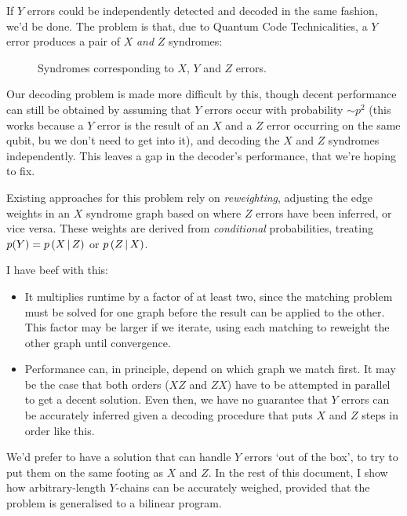 \documentclass[a4paper, english]{scrartcl}
\begin{document}
If $Y$ errors could be independently detected and decoded in the same fashion, we'd be done. 
The problem is that, due to Quantum Code Technicalities\textsuperscript{\textregistered}, a $Y$ error produces a pair of $X$ \emph{and} $Z$ syndromes:
\begin{figure}[!h]
\centering
{}
\caption{Syndromes corresponding to $X$, $Y$ and $Z$ errors.}
\end{figure}

Our decoding problem is made more difficult by this, though decent performance can still be obtained by assuming that $Y$ errors occur with probability $\sim p^2$ (this works because a $Y$ error is the result of an $X$ and a $Z$ error occurring on the same qubit, bu we don't need to get into it), and decoding the $X$ and $Z$ syndromes independently.
This leaves a gap in the decoder's performance, that we're hoping to fix.
 
Existing approaches for this problem \cite{Fowler, DelfosseTillich} rely on \emph{reweighting}, adjusting the edge weights in an $X$ syndrome graph based on where $Z$ errors have been inferred, or vice versa. 
These weights are derived from \emph{conditional} probabilities, treating $p(Y)=p\left(X\, \middle \vert \, Z \right)$ or $p\left(Z\, \middle \vert \, X \right)$.

I have beef with this:
\begin{itemize}
\item It multiplies runtime by a factor of at least two, since the matching problem must be solved for one graph before the result can be applied to the other. 
This factor may be larger if we iterate, using each matching to reweight the other graph until convergence.
\item Performance can, in principle, depend on which graph we match first. It may be the case that both orders ($XZ$ and $ZX$) have to be attempted in parallel to get a decent solution. 
Even then, we have no guarantee that $Y$ errors can be accurately inferred given a decoding procedure that puts $X$ and $Z$ steps in order like this. 
\end{itemize}
We'd prefer to have a solution that can handle $Y$ errors `out of the box', to try to put them on the same footing as $X$ and $Z$. 
In the rest of this document, I show how arbitrary-length $Y$-chains can be accurately weighed, provided that the problem is generalised to a bilinear program. 
\end{document}

